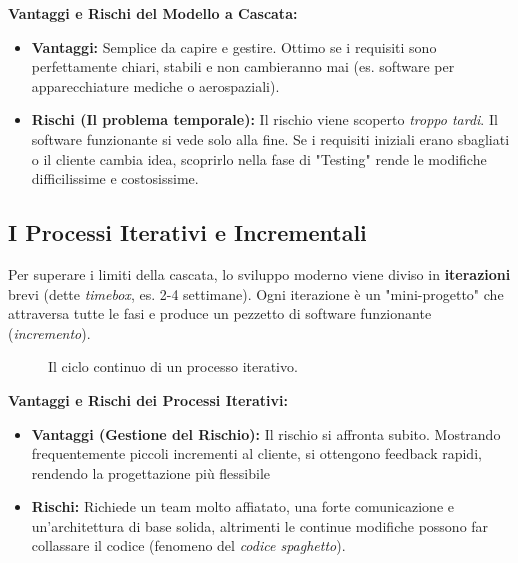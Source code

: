 \documentclass[10pt, a4paper]{article}
\begin{document}
\textbf{Vantaggi e Rischi del Modello a Cascata:}
\begin{itemize}
    \item \textbf{Vantaggi:} Semplice da capire e gestire. Ottimo se i requisiti sono perfettamente chiari, stabili e non cambieranno mai (es. software per apparecchiature mediche o aerospaziali).
    \item \textbf{Rischi (Il problema temporale):} Il rischio viene scoperto \textit{troppo tardi}. Il software funzionante si vede solo alla fine. Se i requisiti iniziali erano sbagliati o il cliente cambia idea, scoprirlo nella fase di "Testing" rende le modifiche difficilissime e costosissime.
\end{itemize}

\subsection{I Processi Iterativi e Incrementali}
Per superare i limiti della cascata, lo sviluppo moderno viene diviso in \textbf{iterazioni} brevi (dette \textit{timebox}, es. 2-4 settimane). Ogni iterazione è un "mini-progetto" che attraversa tutte le fasi e produce un pezzetto di software funzionante (\textit{incremento}).

\begin{figure}[h]
    \centering
    \vspace{0.2cm}
    \caption{Il ciclo continuo di un processo iterativo.}
\end{figure}

\textbf{Vantaggi e Rischi dei Processi Iterativi:}
\begin{itemize}
    \item \textbf{Vantaggi (Gestione del Rischio):} Il rischio si affronta subito. Mostrando frequentemente piccoli incrementi al cliente, si ottengono feedback rapidi, rendendo la progettazione più flessibile 
    \item \textbf{Rischi:} Richiede un team molto affiatato, una forte comunicazione e un'architettura di base solida, altrimenti le continue modifiche possono far collassare il codice (fenomeno del \textit{codice spaghetto}).
\end{itemize}
\end{document}
